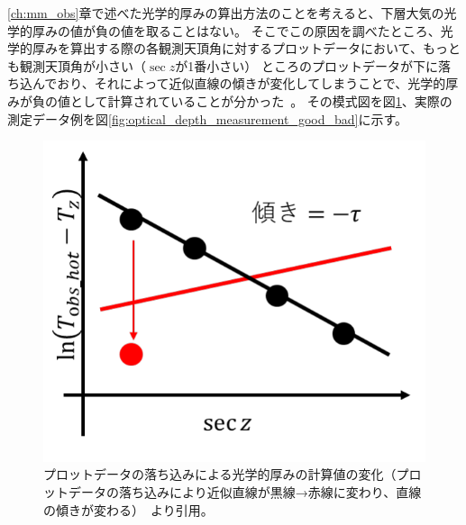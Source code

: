 \ref{ch:mm_obs}章で述べた光学的厚みの算出方法のことを考えると、下層大気の光学的厚みの値が負の値を取ることはない。
そこでこの原因を調べたところ、光学的厚みを算出する際の各観測天頂角に対するプロットデータにおいて、もっとも観測天頂角が小さい（$\sec z$が1番小さい）
ところのプロットデータが下に落ち込んでおり、それによって近似直線の傾きが変化してしまうことで、光学的厚みが負の値として計算されていることが分かった~\cite{goto2021bachelor}。
その模式図を図\ref{fig:optical_depth_slope_minus}、実際の測定データ例を図\ref{fig:optical_depth_measurement_good_bad}に示す。
\begin{figure}[htbp]
    \centering
    \includegraphics[width=\linewidth]{master_thesis_contents/master_thesis_fig/optical_depth_slope_minus.pdf}
    \caption{プロットデータの落ち込みによる光学的厚みの計算値の変化（プロットデータの落ち込みにより近似直線が黒線→赤線に変わり、直線の傾きが変わる）~\cite{goto2021bachelor}より引用。}
    \label{fig:optical_depth_slope_minus}
\end{figure}

